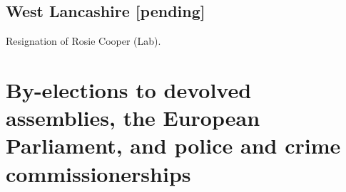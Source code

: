 \documentclass[a4paper,openany]{book}
\begin{document}
%
%
%

\section*{West Lancashire \hspace*{\fill}\nolinebreak[1]%
	\enspace\hspace*{\fill}
	[pending]}


Resignation of Rosie Cooper (Lab).

\chapter{By-elections to devolved assemblies, the European Parliament, and police and crime commissionerships}
\end{document}
